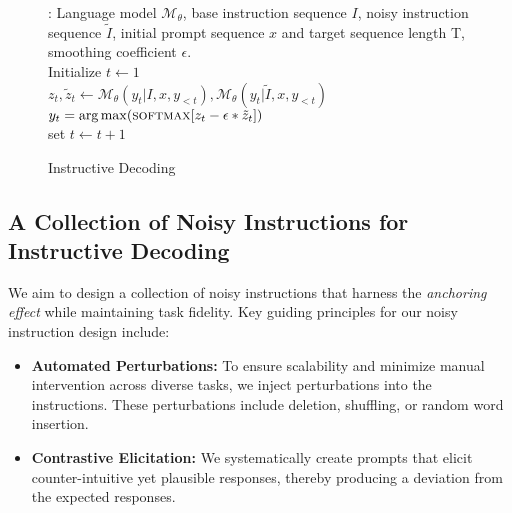 \begin{figure}[t]
\begin{algorithm}[H] 
\DontPrintSemicolon
    \caption{Instructive Decoding}
    \label{algorithm}
    \begin{algorithmic}[1]
    \INPUT: Language model $\mathcal{M}_{\theta}$, base instruction sequence $I$, noisy instruction sequence $\tilde{I}$, initial prompt sequence $x$ and target sequence length T, smoothing coefficient $\epsilon$.\\
    \STATE Initialize $t \leftarrow 1$ \\
        \STATE $z_t, \tilde{z}_t \leftarrow \mathcal{M}_{\theta}(y_t | I, x, y_{<t}), \mathcal{M}_{\theta}(y_t | \tilde{I}, x,y_{<t})$\\
        \STATE $y_{t} = \operatorname*{arg\,max}(\textsc{softmax}[z_t - \epsilon * \tilde{z}_t])$\\
        \STATE set $t \leftarrow t+1$ \\
    \ENDWHILE
\end{algorithmic}
\end{algorithm}
\vspace{-10pt}
\end{figure}

\vspace{-5pt}
\subsection{A Collection of Noisy Instructions for Instructive Decoding}
\vspace{-5pt}
We aim to design a collection of noisy instructions that harness the \textit{anchoring effect} while maintaining task fidelity. Key guiding principles for our noisy instruction design include:

\begin{itemize}[left=0pt]
    \item \textbf{Automated Perturbations:} To ensure scalability and minimize manual intervention across diverse tasks, we inject perturbations into the instructions. These perturbations include deletion, shuffling, or random word insertion.
    
    \item \textbf{Contrastive Elicitation:} We systematically create prompts that elicit counter-intuitive yet plausible responses, thereby producing a deviation from the expected responses.
\end{itemize}


